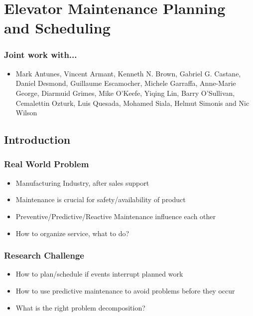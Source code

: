 \section{Elevator Maintenance Planning and Scheduling}

\begin{frame}
\frametitle{Joint work with...}
\begin{itemize}
\item Mark Antunes, Vincent Armant, Kenneth N. Brown, Gabriel G. Castane, Daniel Desmond,
Guillaume Escamocher, Michele Garraffa, Anne-Marie George, Diarmuid Grimes, Mike O'Keefe, Yiqing Lin,
Barry O'Sullivan, Cemalettin Ozturk, Luis Quesada, Mohamed Siala, Helmut Simonis
and Nic Wilson
\end{itemize}
\end{frame}

\subsection{Introduction}

\begin{frame}
\frametitle{Real World Problem}
\begin{itemize}
\item Manufacturing Industry, after sales support
\item Maintenance is crucial for safety/availability of product
\item Preventive/Predictive/Reactive Maintenance influence each other
\item  How to organize service, what to do?
\end{itemize}
\end{frame}

\begin{frame}
\frametitle{Research Challenge}
\begin{itemize}
\item How to plan/schedule if events interrupt planned work
\item How to use predictive maintenance to avoid problems before they occur
\item What is the right problem decomposition?
\end{itemize}
\end{frame}


